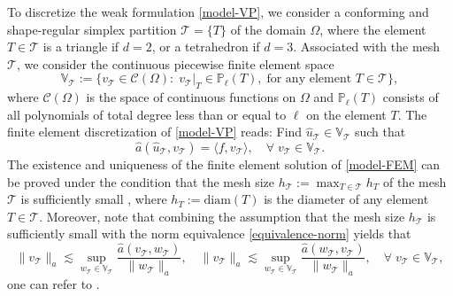\documentclass[preprint,times]{elsarticle}%
\numberwithin{algorithm}{section}
\numberwithin{equation}{section}
\newcommand{\anorm}[1]{\|#1\|_a}
\newcommand{\ha}{\hat{a}}
\newcommand{\hu}{\hat{u}}
\newcommand{\mcT}{\mathcal{T}}
\newcommand{\mbV}{\mathbb{V}}
\begin{document}
To discretize the weak formulation \eqref{model-VP}, we consider a conforming and shape-regular simplex partition $\mcT = \{T\}$ of the domain $\Omega$, where the element $T \in \mcT$ is a triangle if $d = 2$, or a tetrahedron if $d = 3$. Associated with the mesh $\mcT$, we consider the continuous piecewise finite element space 
\begin{equation}\label{space-fem}
	\mbV_\mathcal{T}:= \{v_\mathcal{T} \in \mathcal{C}(\Omega): \; v_\mathcal{T}|_T \in \mathbb{P}_\ell(T), \; \text{for any element }  
	T \in \mcT\},  
\end{equation}
where $\mathcal{C}(\Omega)$ is the space of continuous functions on $\Omega$ and $\mathbb{P}_\ell(T)$ consists of all polynomials of total degree less than or equal to $\ell$ on the element $T$. 
The finite element discretization of \eqref{model-VP} reads: Find  $\hu_\mathcal{T} \in \mbV_\mathcal{T}$ such that 
\begin{equation}\label{model-FEM}
	\ha(\hu_\mathcal{T},v_\mathcal{T}) = \langle f,v_\mathcal{T} \rangle, \quad \forall \; v_\mathcal{T} \in \mbV_\mathcal{T}. 
\end{equation}
The existence and uniqueness of the finite element solution of \eqref{model-FEM} can be proved under the condition that the mesh size $h_\mathcal{T}:=\max_{T \in \mcT} h_T$ of the mesh $\mcT$ is sufficiently small \cite{Schatz74:959,SchatzWang96:19}, where $h_T := \mathrm{diam}(T)$ is the diameter of any element $T \in \mcT$. Moreover, note that combining the assumption that the mesh size $h_{\mathcal{T}}$ is sufficiently small with the norm equivalence \eqref{equivalence-norm} yields that  
\begin{equation}\label{infsup-FEM}
	\anorm{v_\mcT} \lesssim \sup_{w_\mcT \in \mbV_\mcT}\frac{\ha(v_\mcT,w_\mcT)}{\anorm{w_\mcT}}, \quad \anorm{v_\mcT} \lesssim \sup_{w_\mcT \in \mbV_\mcT}\frac{\ha(w_\mcT,v_\mcT)}{\anorm{w_\mcT}}, \quad \forall \; v_\mcT \in \mbV_\mcT,  
\end{equation}
one can refer to \cite[Lemma 2.2]{XuJC96:1759}. 





\end{document}
